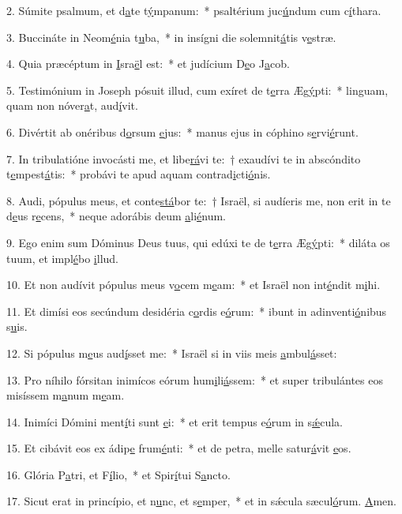 2. Súmite psalmum, et d\uline{a}te t\uline{ý}mpanum:~* psaltérium juc\uline{ú}ndum cum c\uline{í}thara.\par 
3. Buccináte in Neom\uline{é}nia t\uline{u}ba,~* in insígni die solemnit\uline{á}tis v\uline{e}stræ.\par 
4. Quia præcéptum in \uline{I}sra\uline{ë}l est:~* et judícium D\uline{e}o J\uline{a}cob.\par 
5. Testimónium in Joseph pósuit illud, cum exíret de t\uline{e}rra Æg\uline{ý}pti:~* linguam, quam non nóver\uline{a}t, aud\uline{í}vit.\par 
6. Divértit ab onéribus d\uline{o}rsum \uline{e}jus:~* manus ejus in cóphino s\uline{e}rvi\uline{é}runt.\par 
7. In tribulatióne invocásti me, et libe\uline{rá}vi te:~† exaudívi te in abscóndito t\uline{e}mpest\uline{á}tis:~* probávi te apud aquam contrad\uline{i}cti\uline{ó}nis.\par 
8. Audi, pópulus meus, et conte\uline{stá}bor te:~† Israël, si audíeris me, non erit in te d\uline{e}us r\uline{e}cens,~* neque adorábis deum \uline{a}li\uline{é}num.\par 
9. Ego enim sum Dóminus Deus tuus, qui edúxi te de t\uline{e}rra Æg\uline{ý}pti:~* diláta os tuum, et impl\uline{é}bo \uline{i}llud.\par 
10. Et non audívit pópulus meus v\uline{o}cem m\uline{e}am:~* et Israël non int\uline{é}ndit m\uline{i}hi.\par 
11. Et dimísi eos secúndum desidéria c\uline{o}rdis e\uline{ó}rum:~* ibunt in adinventi\uline{ó}nibus s\uline{u}is.\par 
12. Si pópulus m\uline{e}us aud\uline{í}sset me:~* Israël si in viis meis \uline{a}mbul\uline{á}sset:\par 
13. Pro níhilo fórsitan inimícos eórum hum\uline{i}li\uline{á}ssem:~* et super tribulántes eos misíssem m\uline{a}num m\uline{e}am.\par 
14. Inimíci Dómini ment\uline{í}ti sunt \uline{e}i:~* et erit tempus e\uline{ó}rum in s\uline{ǽ}cula.\par 
15. Et cibávit eos ex ádip\uline{e} frum\uline{é}nti:~* et de petra, melle satur\uline{á}vit \uline{e}os.\par 
16. Glória P\uline{a}tri, et F\uline{í}lio,~* et Spir\uline{í}tui S\uline{a}ncto.\par 
17. Sicut erat in princípio, et n\uline{u}nc, et s\uline{e}mper,~* et in sǽcula sæcul\uline{ó}rum. \uline{A}men.\par 

